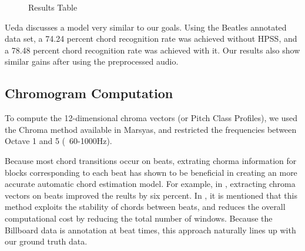 \documentclass{article}
\begin{document}
\begin{figure}
\caption{Results Table}
\label{fig:resulttable}
\end{figure}

Ueda \cite{Ueda:19} discusses a model very similar to our goals. Using the
Beatles annotated data set, a 74.24 percent chord recognition rate was achieved
without HPSS, and a 78.48 percent chord recognition rate was achieved with it.
Our results also show similar gains after using the preprocessed audio.

\subsection{Chromogram Computation}

To compute the 12-dimensional chroma vectors (or Pitch Class Profiles), we used
the Chroma method available in Marsyas, and restricted the frequencies between
Octave 1 and 5 (~60-1000Hz).

Because most chord transitions occur on beats, extrating chorma information for
blocks corresponding to each beat has shown to be beneficial in creating an
more accurate automatic chord estimation model. For example, in \cite{Zenz:20},
extracting chroma vectors on beats improved the reults by six percent. In
\cite{McVicor:00}, it is mentioned that this method exploits the stability of
chords between beats, and reduces the overall computational cost by reducing
the total number of windows. Because the Billboard data is annotation at beat
times, this approach naturally lines up with our ground truth data.
\end{document}
